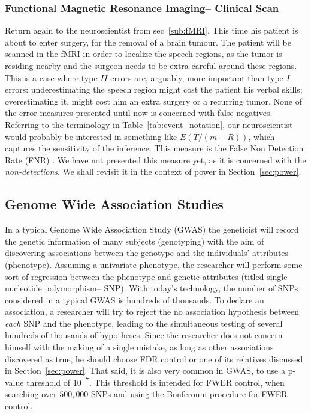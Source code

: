 \documentclass[review,12pt]{article}
\theoremstyle{definition}
\begin{document}
\subsubsection{Functional Magnetic Resonance Imaging-- Clinical Scan}
Return again to the neuroscientist from sec~\ref{sub:fMRI}. This time his patient is about to enter surgery, for the removal of a brain tumour. The patient will be scanned in the fMRI in order to localize the speech regions, as the tumor is residing nearby and the surgeon needs to be extra-careful around these regions. This is a case where type $II$ errors are, arguably, more important than type $I$ errors: underestimating the speech region might cost the patient his verbal skills; overestimating it, might cost him an extra surgery or a recurring tumor. None of the error measures presented until now is concerned with false negatives. Referring to the terminology in Table~\ref{tab:event_notation}, our neuroscientist would probably be interested in something like $E(T/(m-R))$, which captures the sensitivity of the inference. This measure is the False Non Detection Rate (FNR) \citep{genovese_operating_2002}. We have not presented this measure yet, as it is concerned with the \emph{non-detections}. We shall revisit it in the context of power in Section~\ref{sec:power}. 




\subsection{Genome Wide Association Studies}
In a typical Genome Wide Association Study (GWAS) the geneticist will record the genetic information of many subjects (genotyping) with the aim of discovering associations between the genotype and the individuals' attributes (phenotype). Assuming a univariate phenotype, the researcher will perform some sort of regression between the phenotype and genetic attributes (titled single nucleotide polymorphism-- SNP). With today's technology, the number of SNPs considered in a typical GWAS is hundreds of thousands. To declare an association, a researcher will try to reject the no association hypothesis between \emph{each} SNP and the phenotype, leading to the simultaneous testing of several hundreds of thousands of hypotheses. 
Since the researcher does not concern himself with the making of a single mistake, as long as other associations discovered as true, he should choose FDR control or one of its relatives discussed in Section~\ref{sec:power}. 
That said, it is also very common in GWAS, to use a p-value threshold of $10^{-7}$. This threshold is intended for FWER control, when searching over $500,000$ SNPs and using the Bonferonni procedure \cite{bush_chapter_2012} for FWER control. 
\end{document}
